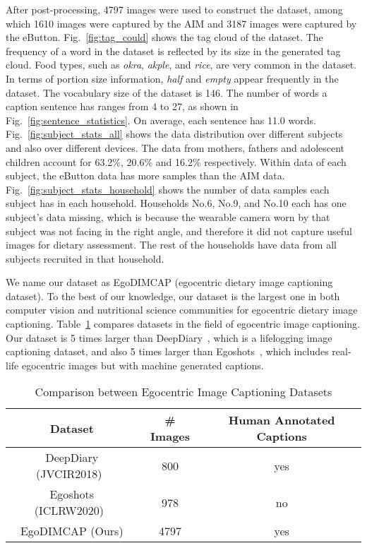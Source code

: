 \documentclass[journal]{IEEEtran}
\begin{document}
After post-processing, 4797 images were used to construct the dataset, among which 1610 images were captured by the AIM and 3187 images were captured by the eButton. Fig.~\ref{fig:tag_could} shows the tag cloud of the dataset. The frequency of a word in the dataset is reflected by its size in the generated tag cloud. Food types, such as \textit{okra}, \textit{akple}, and \textit{rice}, are very common in the dataset. In terms of portion size information, \textit{half} and \textit{empty} appear frequently in the dataset. The vocabulary size of the dataset is 146. The number of words a caption sentence has ranges from 4 to 27, as shown in Fig.~\ref{fig:sentence_statistics}. On average, each sentence has 11.0 words. Fig.~\ref{fig:subject_stats_all} shows the data distribution over different subjects and also over different devices. The data from mothers, fathers and adolescent children account for 63.2\%, 20.6\% and 16.2\% respectively. Within data of each subject, the eButton data has more samples than the AIM data. Fig.~\ref{fig:subject_stats_household} shows the number of data samples each subject has in each household. Households No.6, No.9, and No.10 each has one subject's data missing, which is because the wearable camera worn by that subject was not facing in the right angle, and therefore it did not capture useful images for dietary assessment. The rest of the households have data from all subjects recruited in that household.

We name our dataset as EgoDIMCAP (egocentric dietary image captioning dataset). To the best of our knowledge, our dataset is the largest one in both computer vision and nutritional science communities for egocentric dietary image captioning. Table~\ref{tab:dataset_compare} compares datasets in the field of egocentric image captioning. Our dataset is 5 times larger than DeepDiary~\cite{fan2018deepdiary}, which is a lifelogging image captioning dataset, and also 5 times larger than Egoshots~\cite{agarwal2020egoshots}, which includes real-life egocentric images but with machine generated captions. 



\begin{table}[!t]
\centering
\caption{Comparison between Egocentric Image Captioning Datasets}
\label{tab:dataset_compare}
\begin{tabular}{@{}ccc@{}}
\toprule
Dataset  & \# Images & Human Annotated Captions \\ \midrule
DeepDiary (JVCIR2018)~\cite{fan2018deepdiary} & 800 & yes \\
Egoshots (ICLRW2020)~\cite{agarwal2020egoshots} & 978       &    no             \\
EgoDIMCAP (Ours)         &  4797         &     yes            \\ \bottomrule
\end{tabular}%
\end{table}
\end{document}
